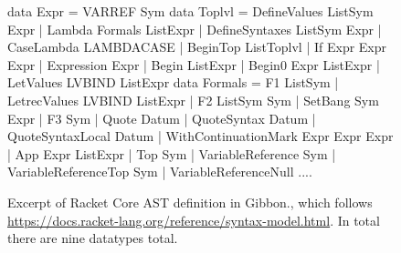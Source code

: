 \documentclass[a4paper,english]{lipics-v2016}
\begin{document}
{\begin{figure}
  \begin{code}   
 data Expr = VARREF Sym                     data Toplvl = DefineValues   ListSym Expr 
           | Lambda Formals ListExpr	                | DefineSyntaxes ListSym Expr  
           | CaseLambda LAMBDACASE                      | BeginTop ListToplvl         
           | If Expr Expr Expr                          | Expression Expr             
           | Begin ListExpr
           | Begin0 Expr ListExpr           
           | LetValues    LVBIND ListExpr   data Formals = F1 ListSym    
           | LetrecValues LVBIND ListExpr                | F2 ListSym Sym
           | SetBang Sym Expr                            | F3 Sym        
           | Quote Datum
           | QuoteSyntax Datum
           | QuoteSyntaxLocal Datum
           | WithContinuationMark Expr Expr Expr
           | App Expr ListExpr 
           | Top Sym
           | VariableReference    Sym 
           | VariableReferenceTop Sym 
           | VariableReferenceNull
    ....
  \end{code}

      







  \caption{Excerpt of Racket Core AST definition in Gibbon., which 
   follows \url{https://docs.racket-lang.org/reference/syntax-model.html}.
   In total there are nine datatypes total.}
  \label{fig:racket-core}
\end{figure}}
\end{document}
